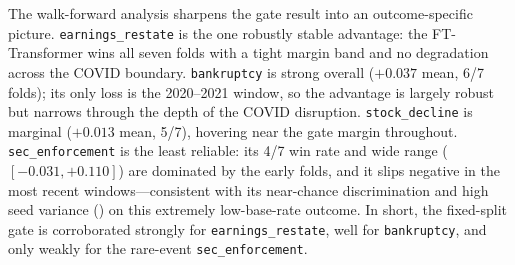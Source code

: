 The walk-forward analysis sharpens the gate result into an outcome-specific picture. \texttt{earnings\_restate} is the one robustly stable advantage: the FT-Transformer wins all seven folds with a tight margin band and no degradation across the COVID boundary. \texttt{bankruptcy} is strong overall ($+0.037$ mean, 6/7 folds); its only loss is the 2020--2021 window, so the advantage is largely robust but narrows through the depth of the COVID disruption. \texttt{stock\_decline} is marginal ($+0.013$ mean, 5/7), hovering near the gate margin throughout. \texttt{sec\_enforcement} is the least reliable: its 4/7 win rate and wide range ($[-0.031, +0.110]$) are dominated by the early folds, and it slips negative in the most recent windows---consistent with its near-chance discrimination and high seed variance () on this extremely low-base-rate outcome. In short, the fixed-split gate is corroborated strongly for \texttt{earnings\_restate}, well for \texttt{bankruptcy}, and only weakly for the rare-event \texttt{sec\_enforcement}.
